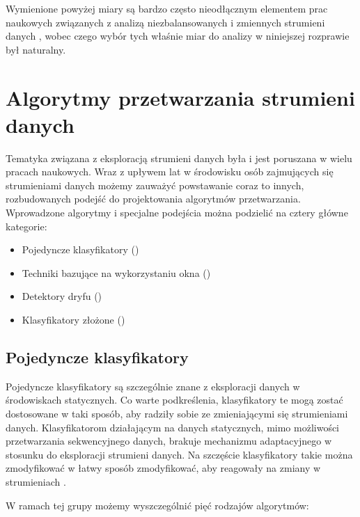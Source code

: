 \noindent Wymienione powyżej miary są bardzo często nieodłącznym elementem prac naukowych związanych z analizą niezbalansowanych i zmiennych strumieni danych \cite{Article:TypyPrzykladow}\cite{Inbook:Metrics}\cite{Article:OBFirst}\cite{Article:OBSecond}, wobec czego wybór tych właśnie miar do analizy w niniejszej rozprawie był naturalny.

\section{Algorytmy przetwarzania strumieni danych}
\label{Teoria:Algorytmy}

\noindent Tematyka związana z eksploracją strumieni danych była i jest poruszana w wielu pracach naukowych. Wraz z upływem lat w środowisku osób zajmujących się strumieniami danych możemy zauważyć powstawanie coraz to innych, rozbudowanych podejść do projektowania algorytmów przetwarzania. Wprowadzone algorytmy i specjalne podejścia można podzielić na cztery główne kategorie:

\begin{itemize}
    \item Pojedyncze klasyfikatory ()
    \item Techniki bazujące na wykorzystaniu okna ()
    \item Detektory dryfu ()
    \item Klasyfikatory złożone ()
\end{itemize}

\subsection{Pojedyncze klasyfikatory}

\noindent Pojedyncze klasyfikatory są szczególnie znane z eksploracji danych w środowiskach statycznych. Co warte podkreślenia, klasyfikatory te mogą zostać dostosowane w taki sposób, aby radziły sobie ze zmieniającymi się strumieniami danych. Klasyfikatorom działającym na danych statycznych, mimo możliwości przetwarzania sekwencyjnego danych, brakuje mechanizmu adaptacyjnego w stosunku do eksploracji strumieni danych. Na szczęście klasyfikatory takie można zmodyfikować w łatwy sposób zmodyfikować, aby reagowały na zmiany w strumieniach \cite{BrzezPhd2015}. 

W ramach tej grupy możemy wyszczególnić pięć rodzajów algorytmów:

